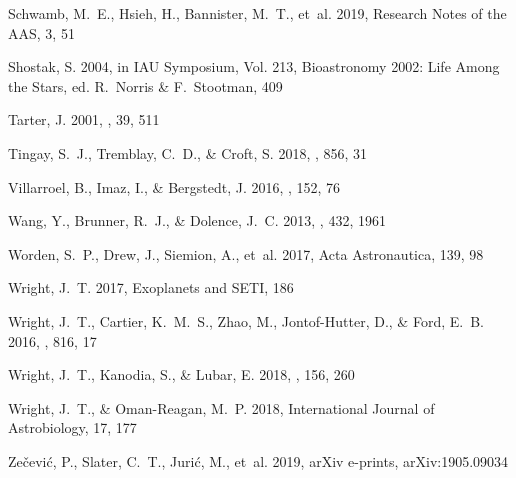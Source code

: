 \documentclass[twocolumn]{aastex62}
\begin{document}
\begin{thebibliography}{}
Schwamb, M.~E., Hsieh, H., Bannister, M.~T., {et~al.} 2019, Research Notes of
  the {AAS}, 3, 51

{Shostak}, S. 2004, in IAU Symposium, Vol. 213, Bioastronomy 2002: Life Among
  the Stars, ed. R.~{Norris} \& F.~{Stootman}, 409

{Tarter}, J. 2001, \araa, 39, 511

{Tingay}, S.~J., {Tremblay}, C.~D., \& {Croft}, S. 2018, \apj, 856, 31

{Villarroel}, B., {Imaz}, I., \& {Bergstedt}, J. 2016, \aj, 152, 76

{Wang}, Y., {Brunner}, R.~J., \& {Dolence}, J.~C. 2013, \mnras, 432, 1961

{Worden}, S.~P., {Drew}, J., {Siemion}, A., {et~al.} 2017, Acta Astronautica,
  139, 98

{Wright}, J.~T. 2017, {Exoplanets and SETI}, 186

{Wright}, J.~T., {Cartier}, K.~M.~S., {Zhao}, M., {Jontof-Hutter}, D., \&
  {Ford}, E.~B. 2016, \apj, 816, 17

{Wright}, J.~T., {Kanodia}, S., \& {Lubar}, E. 2018, \aj, 156, 260

{Wright}, J.~T., \& {Oman-Reagan}, M.~P. 2018, International Journal of
  Astrobiology, 17, 177

{Ze{\v{c}}evi{\'c}}, P., {Slater}, C.~T., {Juri{\'c}}, M., {et~al.} 2019, arXiv
  e-prints, arXiv:1905.09034

\end{thebibliography}
\end{document}
